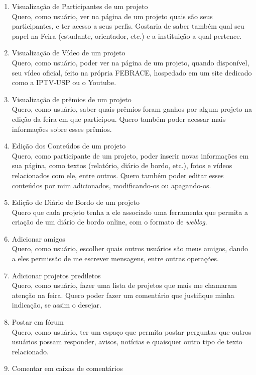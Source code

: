 \documentclass[a4paper,12pt,font=plain,header=plain]{abnt}
\begin{document}
\begin{enumerate}
	 \item Visualização de Participantes de um projeto \\
		Quero, como usuário, ver na página de um projeto quais são seus participantes, e ter acesso a seus perfis. Gostaria de saber também qual seu papel na Feira (estudante, orientador, etc.) e a instituição a qual pertence.
	 \item Visualização de Vídeo de um projeto \\
		Quero, como usuário, poder ver na página de um projeto, quando disponível, seu vídeo oficial, feito na própria FEBRACE, hospedado em um site dedicado como a IPTV-USP ou o Youtube.
	 \item Visualização de prêmios de um projeto \\
		Quero, como usuário, saber quais prêmios foram ganhos por algum projeto na edição da feira em que participou. Quero também poder acessar mais informações sobre esses prêmios.
	 \item Edição dos Conteúdos de um projeto \\
		Quero, como participante de um projeto, poder inserir novas informações em sua página, como textos (relatório, diário de bordo, etc.), fotos e vídeos relacionados com ele, entre outros. Quero também poder editar esses conteúdos por mim adicionados, modificando-os ou apagando-os.
	 \item Edição de Diário de Bordo de um projeto \\
		Quero que cada projeto tenha a ele associado uma ferramenta que permita a criação de um diário de bordo online, com o formato de \textit{weblog}.
	 \item Adicionar amigos \\
		Quero, como usuário, escolher quais outros usuários são meus amigos, dando a eles permissão de me escrever mensagens, entre outras operações.
	 \item Adicionar projetos prediletos \\
		Quero, como usuário, fazer uma lista de projetos que mais me chamaram atenção na feira. Quero poder fazer um comentário que justifique minha indicação, se assim o desejar.
	 \item Postar em fórum \\
		Quero, como usuário, ter um espaço que permita postar perguntas que outros usuários possam responder, avisos, notícias e quaisquer outro tipo de texto relacionado.
	 \item Comentar em caixas de comentários \\

\end{enumerate}
\end{document}
